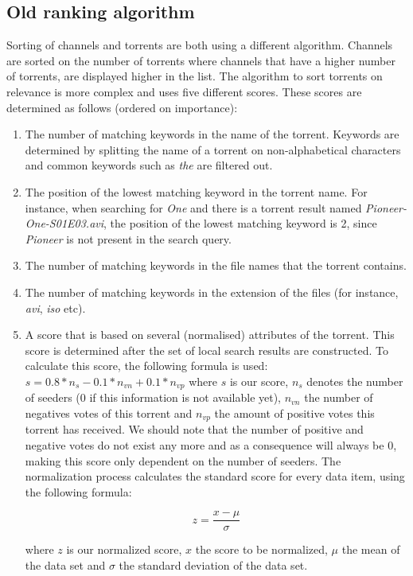 \subsection{Old ranking algorithm}
Sorting of channels and torrents are both using a different algorithm. Channels are sorted on the number of torrents where channels that have a higher number of torrents, are displayed higher in the list. The algorithm to sort torrents on relevance is more complex and uses five different scores. These scores are determined as follows (ordered on importance):
\begin{enumerate}
	\item The number of matching keywords in the name of the torrent. Keywords are determined by splitting the name of a torrent on non-alphabetical characters and common keywords such as \emph{the} are filtered out.
	\item The position of the lowest matching keyword in the torrent name. For instance, when searching for \emph{One} and there is a torrent result named \emph{Pioneer-One-S01E03.avi}, the position of the lowest matching keyword is 2, since \emph{Pioneer} is not present in the search query.
	\item The number of matching keywords in the file names that the torrent contains.
	\item The number of matching keywords in the extension of the files (for instance, \emph{avi}, \emph{iso} etc).
	\item A score that is based on several (normalised) attributes of the torrent. This score is determined after the set of local search results are constructed. To calculate this score, the following formula is used: $ s = 0.8 * n_s - 0.1 * n_{vn} + 0.1 * n_{vp} $ where $ s $ is our score, $ n_s $ denotes the number of seeders (0 if this information is not available yet), $ n_{vn} $ the number of negatives votes of this torrent and $ n_{vp} $ the amount of positive votes this torrent has received. We should note that the number of positive and negative votes do not exist any more and as a consequence will always be 0, making this score only dependent on the number of seeders. The normalization process calculates the standard score for every data item, using the following formula:
	
	\begin{equation}
	\label{eq:normalization-standard-score}
	z = \frac{x - \mu}{\sigma}
	\end{equation}
	
	where $ z $ is our normalized score, $ x $ the score to be normalized, $ \mu $ the mean of the data set and $ \sigma $ the standard deviation of the data set.
	
\end{enumerate}
